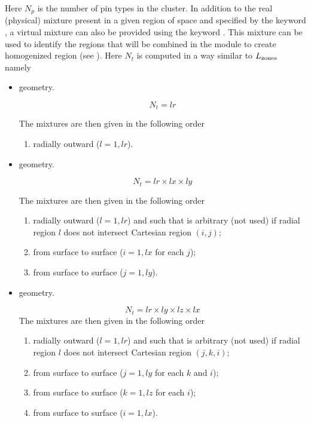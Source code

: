 Here $N_p$ is the number of pin types in the cluster. In addition to the real (physical) mixture  present in a given region of space and specified by the keyword , a virtual mixture  can also be provided using the keyword . This mixture can be used to identify the regions that will be combined in the  module to create homogenized region  (see ). Here $N_{t}$
is computed in a way similar to $L_{\rm zones}$ namely
\begin{itemize}

\item {} geometry.

$$N_{t}=\textit{lr}$$

The mixtures are then given in the following order
\begin{enumerate}
\item radially outward ($l=1,\textit{lr}$).
\end{enumerate}

\item {} geometry.

$$N_{t}=\textit{lr}\times\textit{lx}\times \textit{ly}  $$

The mixtures are then given in the following order
\begin{enumerate}
\item radially outward ($l=1,\textit{lr}$) and such that   is arbitrary (not used) if radial region $l$ does not intersect Cartesian region $(i,j)$;
\item from surface  to surface  ($i=1,\textit{lx}$ for each $j$);
\item from surface  to surface  ($j=1,\textit{ly}$).
\end{enumerate}

\item {} geometry.

$$N_{t}=\textit{lr}\times\textit{ly}\times \textit{lz}\times \textit{lx}$$
The mixtures are then given in the following order
\begin{enumerate}
\item radially outward ($l=1,\textit{lr}$) and such that  is arbitrary (not used) if radial region $l$ does not intersect Cartesian region $(j,k,i)$;
\item from surface  to surface  ($j=1,\textit{ly}$ for each $k$ and $i$);
\item from surface  to surface  ($k=1,\textit{lz}$ for each $i$);
\item from surface  to surface  ($i=1,\textit{lx}$).
\end{enumerate}


\end{itemize}
